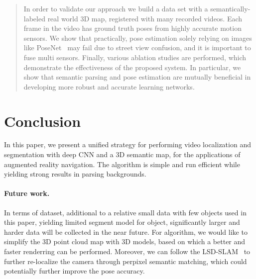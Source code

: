 \documentclass[10pt,twocolumn,letterpaper]{article}
\begin{document}
\begin{abstract}
In order to validate our approach we build a data set with a semantically-labeled real world 3D map, registered with many recorded videos. Each frame in the video has ground truth poses from highly accurate motion sensors.
We show that practically, pose estimation solely relying on images like PoseNet~\cite{Kendall_2015_ICCV} may fail due to street view confusion, and it is important to fuse multi sensors.  Finally, various ablation studies are performed, which demonstrate the effectiveness of the proposed system. In particular, we show that semantic parsing and pose estimation are mutually beneficial in developing more robust and accurate learning networks.


\end{abstract}








\section{Conclusion}
\label{sec:conclusion}
In this paper, we present a unified strategy for performing video localization and segmentation with deep CNN and a 3D semantic map, for the applications of augmented reality navigation. The algorithm is simple and run efficient while yielding strong results in parsing backgrounds.

\paragraph{Future work.} In terms of dataset, additional to a relative small data with few objects used in this paper, yielding limited segment model for object, significantly larger and harder data will be collected in the near future.
For algorithm, we would like to simplify the 3D point cloud map with 3D models, based on which a better and faster renderring can be performed.
Moreover, we can follow the LSD-SLAM~\cite{engel2014lsd} to further re-localize the camera through perpixel semantic matching, which could potentially further improve the pose accuracy.

%
{\small


}
\end{document}
